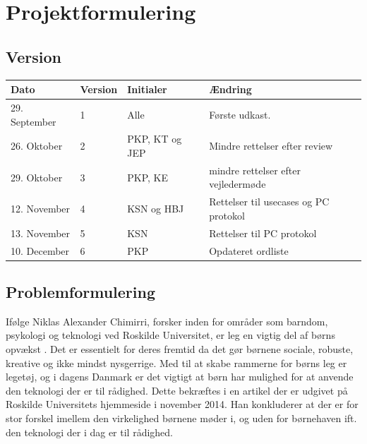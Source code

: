 \chapter{Projektformulering} \label{ch:projektformulering}
\section*{Version}
\begin{table}[h]
	\centering
	\begin{tabularx}{\textwidth - 2cm}{|l|l|l|X|}
	\hline
	Dato			& Version			& Initialer 		& Ændring										\\ \hline
	29. September 	& 1 				& Alle				& Første udkast. 								\\ \hline
	26. Oktober		& 2 				& PKP, KT og JEP	& Mindre rettelser efter review					\\ \hline
	29.	Oktober		& 3 				& PKP, KE 			& mindre rettelser efter vejledermøde			\\ \hline
	12.	November    & 4 				& KSN og HBJ		& Rettelser til usecases og PC protokol			\\ \hline
	13.	November    & 5 				& KSN       		& Rettelser til PC protokol						\\ \hline
	10.	December    & 6 				& PKP       		& Opdateret ordliste							\\ \hline
	\end{tabularx}
\end{table}
\clearpage

\section{Problemformulering} \label{sec:problemformulering}
Ifølge Niklas Alexander Chimirri, forsker inden for områder som barndom, psykologi og teknologi ved Roskilde Universitet, er leg en vigtig del af børns opvækst \cite{lib:RUC}.   
Det er essentielt for deres fremtid da det gør børnene sociale, robuste, kreative og ikke mindst nysgerrige. Med til at skabe rammerne for børns leg er legetøj, og i dagens Danmark er det vigtigt at børn har mulighed for at anvende den teknologi der er til rådighed. 
Dette bekræftes i en artikel der er udgivet på Roskilde Universitets hjemmeside i november 2014.
Han konkluderer at der er for stor forskel imellem den virkelighed børnene møder i, og uden for børnehaven ift. den teknologi der i dag er til rådighed. 


